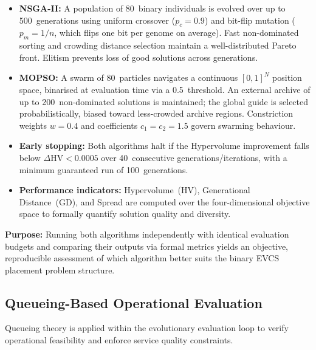 \begin{itemize}
    \item \textbf{NSGA-II:} A population of 80~binary individuals
          is evolved over up to 500~generations using uniform
          crossover ($p_c = 0.9$) and bit-flip mutation
          ($p_m = 1/n$, which flips one bit per genome on average).
          Fast non-dominated sorting and
          crowding distance selection maintain a well-distributed
          Pareto front. Elitism prevents loss of good solutions
          across generations.
    \item \textbf{MOPSO:} A swarm of 80~particles navigates a
          continuous $[0,1]^N$ position space, binarised at
          evaluation time via a 0.5~threshold. An external archive
          of up to 200~non-dominated solutions is maintained;
          the global guide is selected probabilistically, biased
          toward less-crowded archive regions. Constriction
          weights $w = 0.4$ and coefficients $c_1 = c_2 = 1.5$
          govern swarming behaviour.
    \item \textbf{Early stopping:} Both algorithms halt if the
          Hypervolume improvement falls below $\Delta\text{HV}
          < 0.0005$ over 40~consecutive generations/iterations,
          with a minimum guaranteed run of 100~generations.
    \item \textbf{Performance indicators:} Hypervolume~(HV),
          Generational Distance~(GD), and Spread are computed
          over the four-dimensional objective space to formally
          quantify solution quality and diversity.
\end{itemize}

\noindent\textbf{Purpose:} Running both algorithms independently
with identical evaluation budgets and comparing their outputs via
formal metrics yields an objective, reproducible assessment of
which algorithm better suits the binary EVCS placement problem
structure.

\subsection{Queueing-Based Operational Evaluation}
Queueing theory is applied within the evolutionary evaluation loop
to verify operational feasibility and enforce service quality
constraints.

